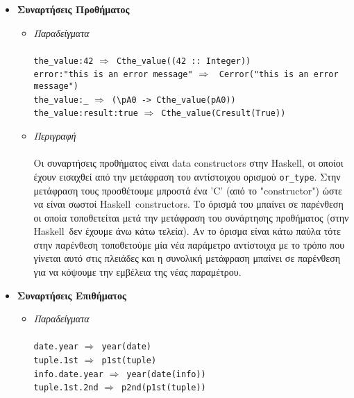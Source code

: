 \documentclass[diploma]{softlab-thesis}
\def\H{Haskell}
\def\lra{$\Longrightarrow$\ }
\begin{document}
\begin{itemize}
\item
\textbf{Συναρτήσεις Προθήματος}
\begin{itemize}
\item
\textit{Παραδείγματα}\\\\
\verb|the_value:42| \lra \verb|Cthe_value((42 :: Integer))| \\
\texttt{error:"this is an error message"} \lra
\texttt{Cerror("this is an error message")} \\
\verb|the_value:_| \lra \verb|(\pA0 -> Cthe_value(pA0))| \\
\verb|the_value:result:true| \lra \verb|Cthe_value(Cresult(True))| \\

\item
\textit{Περιγραφή}\\\\
Οι συναρτήσεις προθήματος είναι data constructors στην \H, οι οποίοι έχουν
εισαχθεί από την μετάφραση του αντίστοιχου ορισμού \verb|or_type|. Στην
μετάφραση τους προσθέτουμε μπροστά ένα 'C' (από το "constructor") ώστε να είναι
σωστοί \H\ constructors. Το όρισμά του μπαίνει σε παρένθεση οι οποία
τοποθετείται μετά την μετάφραση του συνάρτησης προθήματος (στην \H\ δεν έχουμε
άνω κάτω τελεία). Αν το όρισμα είναι κάτω παύλα τότε στην παρένθεση τοποθετούμε
μία νέα παράμετρο αντίστοιχα με το τρόπο που γίνεται αυτό στις πλειάδες και
η συνολική μετάφραση μπαίνει σε παρένθεση για να κόψουμε την εμβέλεια της νέας
παραμέτρου.
\end{itemize}

\item
\textbf{Συναρτήσεις Επιθήματος}

\begin{itemize}
\item
\textit{Παραδείγματα}\\\\
\texttt{date.year} \lra \texttt{year(date)} \\
\texttt{tuple.1st} \lra \texttt{p1st(tuple)} \\
\texttt{info.date.year} \lra \texttt{year(date(info))} \\
\texttt{tuple.1st.2nd} \lra \texttt{p2nd(p1st(tuple))} \\


\end{itemize}
\end{itemize}
\end{document}
